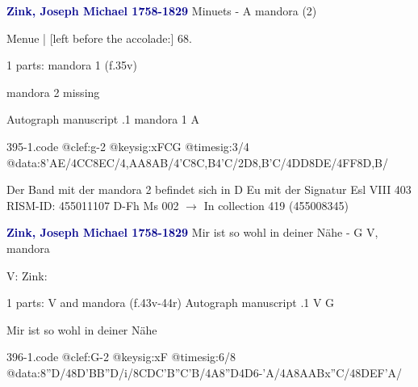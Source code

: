 \documentclass[twocolumn]{book}
\begin{document}
\newline \par \vspace{7pt} \textcolor{darkblue}{\textbf{Zink, Joseph Michael  1758-1829}}
\newline Minuets - A
\newline mandora (2)
\newline \begin{itshape}[f.35v, at left:] Menue | [left before the accolade:] 68.\end{itshape} 
\newline \textcolor{darkblue}{}  1 parts: mandora 1  (f.35v)
\newline \begin{small} mandora 2 missing\end{small} 
\newline Autograph manuscript
.1  mandora 1  A  
\begin{filecontents*}{395-1.code}
@clef:g-2
@keysig:xFCG
@timesig:3/4
@data:{8'AE}/4CC{8EC}/4,AA{8AB}/4'C{8C,B}4'C/2D{8,B'C}/4DD{8DE}/4FF{8D,B}/
\end{filecontents*}
\newline
%

\newline Der Band mit der mandora 2 befindet sich in D Eu mit der Signatur Esl VIII 403
\newline RISM-ID: 455011107
\newline D-Fh  Ms 002
\newline $\rightarrow$ In collection 419 (455008345)
      
\newline \par \vspace{7pt} \textcolor{darkblue}{\textbf{Zink, Joseph Michael  1758-1829}}
\newline Mir ist so wohl in deiner Nähe - G
\newline V, mandora
\newline \begin{itshape}[at left, f.43v:] V: Zink:\end{itshape} 
\newline \textcolor{darkblue}{}  1 parts: V and mandora  (f.43v-44r)
\newline Autograph manuscript
.1  V  G
\newline \begin{footnotesize} Mir ist so wohl in deiner Nähe \end{footnotesize}  
\begin{filecontents*}{396-1.code}
@clef:G-2
@keysig:xF
@timesig:6/8
@data:8''D/48D'BB''D/i/{8CD}C{'B''C}'B/4A8''D4D6-'A/4A8A{AB}x''C/48DEF'A/
\end{filecontents*}
\newline
%
\end{document}
